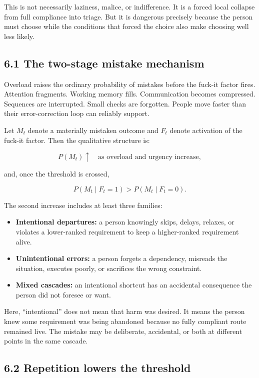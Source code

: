 \documentclass[11pt,oneside]{article}
\providecommand{\tightlist}{%
  \setlength{\itemsep}{0.22em}\setlength{\parskip}{0pt}}
\begin{document}
This is not necessarily laziness, malice, or indifference. It is a
forced local collapse from full compliance into triage. But it is
dangerous precisely because the person must choose while the conditions
that forced the choice also make choosing well less likely.

\subsection{6.1 The two-stage mistake
mechanism}\label{the-two-stage-mistake-mechanism}

Overload raises the ordinary probability of mistakes before the fuck-it
factor fires. Attention fragments. Working memory fills. Communication
becomes compressed. Sequences are interrupted. Small checks are
forgotten. People move faster than their error-correction loop can
reliably support.

Let \(M_t\) denote a materially mistaken outcome and \(F_t\) denote
activation of the fuck-it factor. Then the qualitative structure is:

\[
P(M_t)\uparrow \quad\text{as overload and urgency increase},
\]

and, once the threshold is crossed,

\[
P(M_t\mid F_t=1) > P(M_t\mid F_t=0).
\]

The second increase includes at least three families:

\begin{itemize}
\tightlist
\item
  \textbf{Intentional departures:} a person knowingly skips, delays,
  relaxes, or violates a lower-ranked requirement to keep a
  higher-ranked requirement alive.
\item
  \textbf{Unintentional errors:} a person forgets a dependency, misreads
  the situation, executes poorly, or sacrifices the wrong constraint.
\item
  \textbf{Mixed cascades:} an intentional shortcut has an accidental
  consequence the person did not foresee or want.
\end{itemize}

Here, ``intentional'' does not mean that harm was desired. It means the
person knew some requirement was being abandoned because no fully
compliant route remained live. The mistake may be deliberate,
accidental, or both at different points in the same cascade.

\subsection{6.2 Repetition lowers the
threshold}\label{repetition-lowers-the-threshold}
\end{document}
